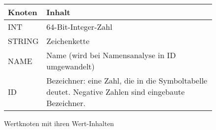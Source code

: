 \documentclass[11pt,a4paper]{article}
\begin{document}
\begin{figure}[h]
\begin{tabular}{|p{3cm}|p{14cm}|}
\hline
\textbf{Knoten} & \textbf{Inhalt} \\
\hline
\hline
\textsf{INT} &  64-Bit-Integer-Zahl\\
\hline
\textsf{STRING} & Zeichenkette \\
\hline
\textsf{NAME  } & Name (wird bei Namensanalyse in \textsf{ID} umgewandelt) \\
\hline
\textsf{ID    } & Bezeichner: eine Zahl, die in die Symboltabelle deutet.  Negative Zahlen sind eingebaute Bezeichner.  \\
\hline
\end{tabular}
\caption{Wertknoten mit ihren Wert-Inhalten}\label{fig:valnodes}
\end{figure}
\end{document}
